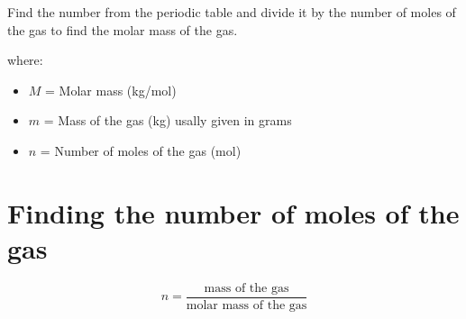 \documentclass{article}
\begin{document}
Find the number from the periodic table and divide it by the number of moles of the gas to find the molar mass of the gas.

where:
\begin{itemize}
    \item $M$ = Molar mass (kg/mol)
    \item $m$ = Mass of the gas (kg) usally given in grams
    \item $n$ = Number of moles of the gas (mol)
\end{itemize}


\section*{Finding the number of moles of the gas}
\begin{equation}
    n = \frac{\text{mass of the gas}}{\text{molar mass of the gas}}
\end{equation}
\end{document}
